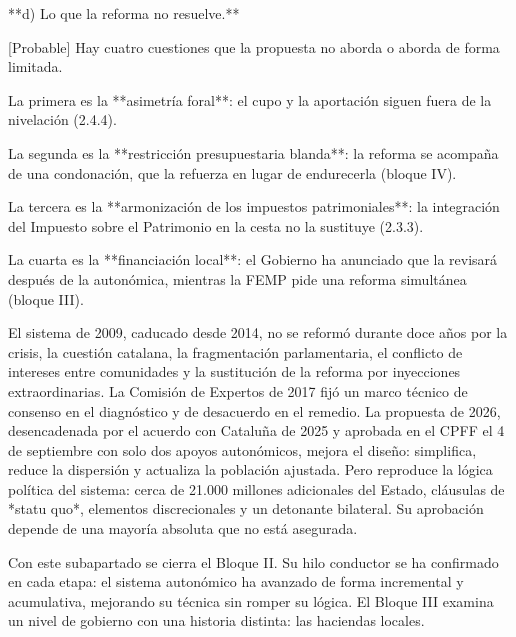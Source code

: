 \documentclass[10pt,a4paper]{article}
\begin{document}
**d) Lo que la reforma no resuelve.**

[Probable] Hay cuatro cuestiones que la propuesta no aborda o aborda de forma limitada.

La primera es la **asimetría foral**: el cupo y la aportación siguen fuera de la nivelación (2.4.4).

La segunda es la **restricción presupuestaria blanda**: la reforma se acompaña de una condonación, que la refuerza en lugar de endurecerla (bloque IV).

La tercera es la **armonización de los impuestos patrimoniales**: la integración del Impuesto sobre el Patrimonio en la cesta no la sustituye (2.3.3).

La cuarta es la **financiación local**: el Gobierno ha anunciado que la revisará después de la autonómica, mientras la FEMP pide una reforma simultánea (bloque III).


El sistema de 2009, caducado desde 2014, no se reformó durante doce años por la crisis, la cuestión catalana, la fragmentación parlamentaria, el conflicto de intereses entre comunidades y la sustitución de la reforma por inyecciones extraordinarias. La Comisión de Expertos de 2017 fijó un marco técnico de consenso en el diagnóstico y de desacuerdo en el remedio. La propuesta de 2026, desencadenada por el acuerdo con Cataluña de 2025 y aprobada en el CPFF el 4 de septiembre con solo dos apoyos autonómicos, mejora el diseño: simplifica, reduce la dispersión y actualiza la población ajustada. Pero reproduce la lógica política del sistema: cerca de 21.000 millones adicionales del Estado, cláusulas de *statu quo*, elementos discrecionales y un detonante bilateral. Su aprobación depende de una mayoría absoluta que no está asegurada.

Con este subapartado se cierra el Bloque II. Su hilo conductor se ha confirmado en cada etapa: el sistema autonómico ha avanzado de forma incremental y acumulativa, mejorando su técnica sin romper su lógica. El Bloque III examina un nivel de gobierno con una historia distinta: las haciendas locales.





\clearpage
\end{document}
